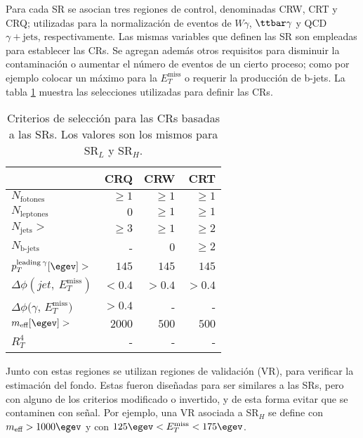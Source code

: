 Para cada SR se asocian tres regiones de control, denominadas CRW, CRT y CRQ; utilizadas para la normalización de eventos de $W\gamma$, $\ttbar\gamma$ y QCD $\gamma + \text{jets}$, respectivamente. Las mismas variables que definen las SR son empleadas para establecer las CRs. Se agregan además otros requisitos para disminuir la contaminación o aumentar el número de eventos de un cierto proceso; como por ejemplo colocar un máximo para la $E_{T}^{\text{miss}}$ o requerir la producción de b-jets. La tabla \ref{crs} muestra las selecciones utilizadas para definir las CRs.

\begin{table}
\centering
\caption{Criterios de selección para las CRs basadas a las SRs. Los valores son los mismos para SR$_{L}$ y SR$_{H}$.}
\begin{tabular}{ l | r r r }

	\hline

	 & CRQ & CRW & CRT \\

	 \hline

	$N_{\text{fotones}}$ 	& $\ge1$ & $\ge1$ & $\ge1$ \\

	$N_{\text{leptones}}$ 	& $0$ & $\ge1$ & $\ge1$ \\

	$N_{\text{jets}}>$ 		& $\ge3$ &	$\ge1$	& $\ge2$ \\

	$N_{\text{b-jets}}$ 	& - &	$0$	& $\ge2$ \\

	$p_{T}^{\text{leading}\: \gamma} [\egev]>$ 	& $145$ 	& $145$ 	& 	$145$ \\

	$\Delta\phi(jet,\: E_{T}^{\text{miss}})$ 	& $<0.4$ 	& $>0.4$ 	&  $>0.4$\\

	$\Delta\phi(\gamma$,\: $E_{T}^{\text{miss}})$	& $>0.4$ 	& - 	& -	\\

	$m_{\text{eff}} [\egev]>$ 	& $2000$ 	& $500$ 	& $500$	\\

	$R_{T}^{4}$ 	& - 	& - 	& -	\\

	\hline

\end{tabular}
\label{crs}
\end{table}


Junto con estas regiones se utilizan regiones de validación (VR), para verificar la estimación del fondo. Estas fueron diseñadas para ser similares a las SRs, pero con alguno de los criterios modificado o invertido, y de esta forma evitar que se contaminen con señal. Por ejemplo, una VR asociada a SR$_{H}$ se define con $m_{\text{eff}}>1000 \egev$ y con $125 \egev < E_{T}^{\text{miss}} < 175 \egev$. 